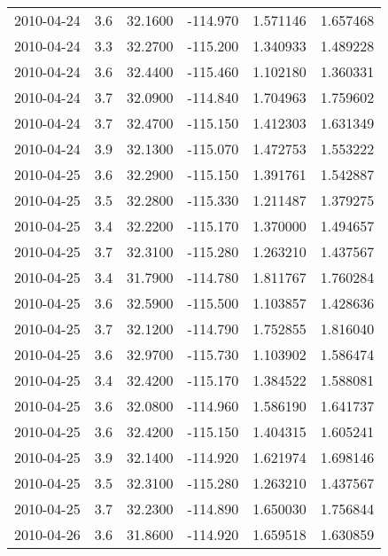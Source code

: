 \begin{tabular}{lrrrrr}
2010-04-24 &       3.6 &  32.1600 &  -114.970 &         1.571146 &         1.657468 \\
2010-04-24 &       3.3 &  32.2700 &  -115.200 &         1.340933 &         1.489228 \\
2010-04-24 &       3.6 &  32.4400 &  -115.460 &         1.102180 &         1.360331 \\
2010-04-24 &       3.7 &  32.0900 &  -114.840 &         1.704963 &         1.759602 \\
2010-04-24 &       3.7 &  32.4700 &  -115.150 &         1.412303 &         1.631349 \\
2010-04-24 &       3.9 &  32.1300 &  -115.070 &         1.472753 &         1.553222 \\
2010-04-25 &       3.6 &  32.2900 &  -115.150 &         1.391761 &         1.542887 \\
2010-04-25 &       3.5 &  32.2800 &  -115.330 &         1.211487 &         1.379275 \\
2010-04-25 &       3.4 &  32.2200 &  -115.170 &         1.370000 &         1.494657 \\
2010-04-25 &       3.7 &  32.3100 &  -115.280 &         1.263210 &         1.437567 \\
2010-04-25 &       3.4 &  31.7900 &  -114.780 &         1.811767 &         1.760284 \\
2010-04-25 &       3.6 &  32.5900 &  -115.500 &         1.103857 &         1.428636 \\
2010-04-25 &       3.7 &  32.1200 &  -114.790 &         1.752855 &         1.816040 \\
2010-04-25 &       3.6 &  32.9700 &  -115.730 &         1.103902 &         1.586474 \\
2010-04-25 &       3.4 &  32.4200 &  -115.170 &         1.384522 &         1.588081 \\
2010-04-25 &       3.6 &  32.0800 &  -114.960 &         1.586190 &         1.641737 \\
2010-04-25 &       3.6 &  32.4200 &  -115.150 &         1.404315 &         1.605241 \\
2010-04-25 &       3.9 &  32.1400 &  -114.920 &         1.621974 &         1.698146 \\
2010-04-25 &       3.5 &  32.3100 &  -115.280 &         1.263210 &         1.437567 \\
2010-04-25 &       3.7 &  32.2300 &  -114.890 &         1.650030 &         1.756844 \\
2010-04-26 &       3.6 &  31.8600 &  -114.920 &         1.659518 &         1.630859 \\

\end{tabular}
